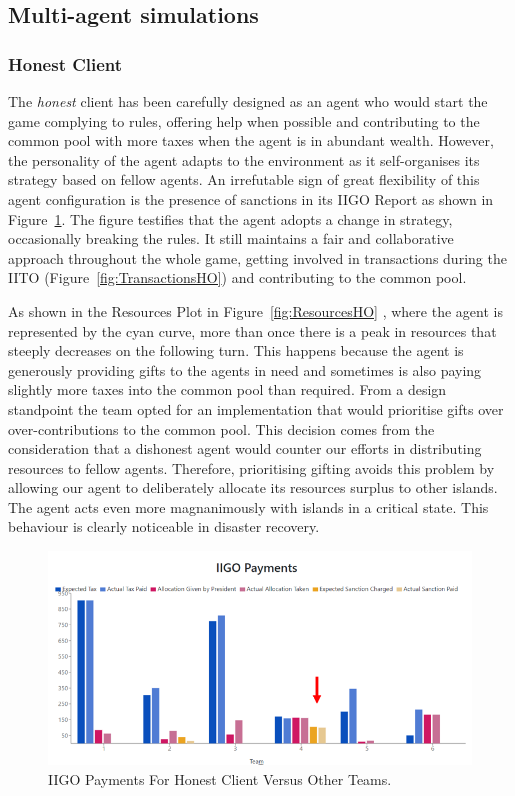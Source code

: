 \subsection{Multi-agent simulations} \label{againstothers}
\subsubsection{Honest Client} \label{honestAO}
The \emph{honest} client has been carefully designed as an agent who would start the game complying to rules, offering help when possible and contributing to the common pool with more taxes when the agent is in abundant wealth. However, the personality of the agent adapts to the environment as it self-organises its strategy based on fellow agents. An irrefutable sign of great flexibility of this agent configuration is the presence of sanctions in its IIGO Report as shown in Figure~\ref{fig:IIGOHO}. The figure testifies that the agent adopts a change in strategy, occasionally breaking the rules. It still maintains a fair and collaborative approach throughout the whole game, getting involved in transactions during the IITO (Figure~\ref{fig:TransactionsHO}) and contributing to the common pool. 

As shown in the Resources Plot in Figure~\ref{fig:ResourcesHO} , where the agent is represented by the cyan curve, more than once there is a peak in resources that steeply decreases on the following turn. This happens because the agent is generously providing gifts to the agents in need and sometimes is also paying slightly more taxes into the common pool than required. From a design standpoint the team opted for an implementation that would prioritise gifts over over-contributions to the common pool. This decision comes from the consideration that a dishonest agent would counter our efforts in distributing resources to fellow agents. Therefore, prioritising gifting avoids this problem by allowing our agent to deliberately allocate its resources surplus to other islands. The agent acts even more magnanimously with islands in a critical state. This behaviour is clearly noticeable in disaster recovery.
\begin{figure}[H]
\centering
\includegraphics[scale=0.6]{12_team4_agentdesign/images/IIGOHO.PNG}
\caption{IIGO Payments For Honest Client Versus Other Teams.}
\label{fig:IIGOHO}
\end{figure}

